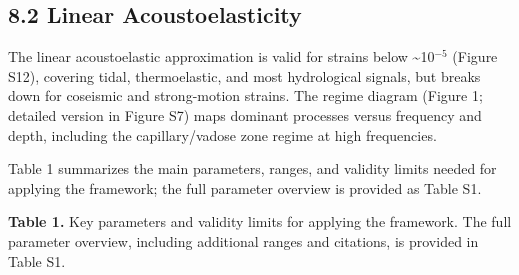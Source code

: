 \documentclass[12pt]{article}
\begin{document}
\subsection{8.2 Linear
Acoustoelasticity}\label{linear-acoustoelasticity}

The linear acoustoelastic approximation is valid for strains below
\textasciitilde{}10\(^{-5}\) (Figure S12), covering tidal,
thermoelastic, and most hydrological signals, but breaks down for
coseismic and strong-motion strains. The regime diagram (Figure 1;
detailed version in Figure S7) maps dominant processes versus frequency
and depth, including the capillary/vadose zone regime at high
frequencies.

Table 1 summarizes the main parameters, ranges, and validity limits
needed for applying the framework; the full parameter overview is
provided as Table S1.

\textbf{Table 1.} Key parameters and validity limits for applying the
framework. The full parameter overview, including additional ranges and
citations, is provided in Table S1.
\end{document}
